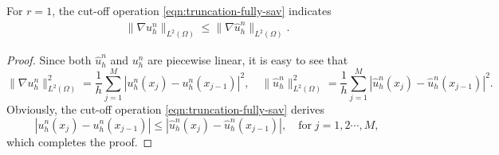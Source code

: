 \documentclass[10pt,final,leqno,onefignum,onetabnum]{siamltex}%
\def\II{(\Omega)}
\begin{document}
\begin{lemma}\label{lem:cutoff-energy}
For $r=1$, the cut-off operation \eqref{eqn:truncation-fully-sav} indicates
\begin{align}
  \| \nabla  u_h^{n}\|_{L^2\II} \le  \| \nabla  \hat u_h^{n}\|_{L^2\II}.\label{grd-decay}
\end{align}
\end{lemma}
\begin{proof}
Since both $\hat u_h^{n}$ and $u_h^{n}$ are piecewise linear, it is easy to see that
$$\| \nabla  u_h^{n}\|_{L^2\II}^2=\frac{1}{h}\sum_{j=1}^M\left|u_h^n(x_j)-u_h^n(x_{j-1})\right|^2,\quad \|\hat u_h^{n}\|_{L^2\II}^2=\frac{1}{h}\sum_{j=1}^M\left|\hat u_h^n(x_j)-\hat u_h^n(x_{j-1})\right|^2.
$$
Obviously, the cut-off operation \eqref{eqn:truncation-fully-sav} derives
$$\left|u_h^n(x_j)-u_h^n(x_{j-1})\right|\le \left|\hat u_h^n(x_j)-\hat u_h^n(x_{j-1})\right|,\quad \text{for}\;j=1,2\cdots,M,$$
which completes the proof.
\end{proof}
\end{document}
